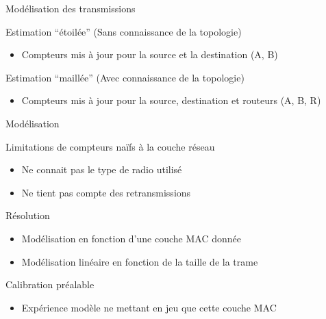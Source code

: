 \begin{frame}{Modélisation des transmissions}
  \begin{figure}
    
  \end{figure}
  \begin{block}{Estimation ``étoilée'' (Sans connaissance de la topologie)}
    \begin{itemize}
      \item Compteurs mis à jour pour la source et la destination (A, B)
    \end{itemize}
  \end{block}
  \begin{block}{Estimation ``maillée'' (Avec connaissance de la topologie)}
    \begin{itemize}
      \item Compteurs mis à jour pour la source, destination et routeurs (A, B, R)
    \end{itemize}
  \end{block}
\end{frame}

\begin{frame}{Modélisation}
  \begin{block}{Limitations de compteurs naïfs à la couche réseau}
    \begin{itemize}
      \item Ne connait pas le type de radio utilisé
      \item Ne tient pas compte des retransmissions
    \end{itemize}
  \end{block}
  \begin{block}{Résolution}
    \begin{itemize}
      \item Modélisation en fonction d'une couche MAC donnée
      \item Modélisation linéaire en fonction de la taille de la trame
    \end{itemize}
  \end{block}
  \begin{alertblock}{Calibration préalable}
    \begin{itemize}
      \item Expérience modèle ne mettant en jeu que cette couche MAC
    \end{itemize}
  \end{alertblock}
\end{frame}

